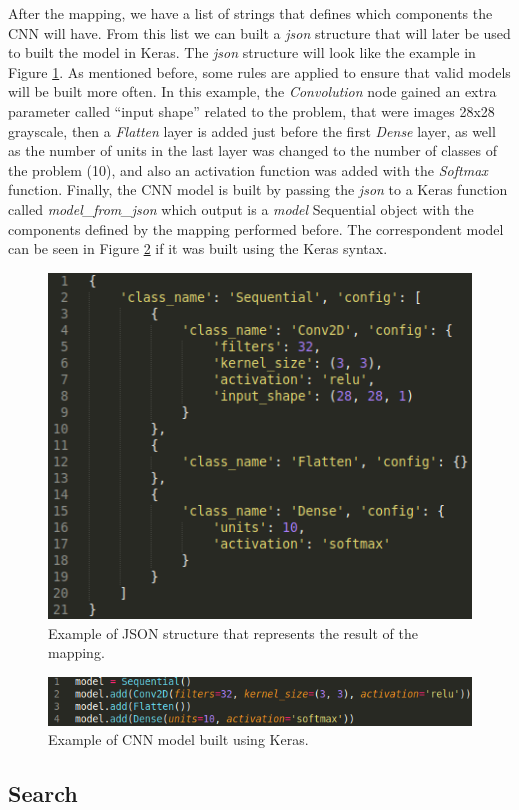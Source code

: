 \documentclass[12pt]{article}
\begin{document}
After the mapping, we have a list of strings that defines which components the CNN will have. From this list we can built a \textit{json} structure that will later be used to built the model in Keras. The \textit{json} structure will look like the example in Figure \ref{fig:json-example}. As mentioned before, some rules are applied to ensure that valid models will be built more often. In this example, the \textit{Convolution} node gained an extra parameter called ``input shape'' related to the problem, that were images 28x28 grayscale, then a \textit{Flatten} layer is added just before the first \textit{Dense} layer, as well as the number of units in the last layer was changed to the number of classes of the problem (10), and also an activation function was added with the \textit{Softmax} function. Finally, the CNN model is built by passing the \textit{json} to a Keras function called \textit{model\_from\_json} which output is a \textit{model} Sequential object with the components defined by the mapping performed before. The correspondent model can be seen in Figure \ref{fig:model-example} if it was built using the Keras syntax.


\begin{figure}[!htb]
	\includegraphics[width=\linewidth]{images/json-example.png}
	\caption{Example of JSON structure that represents the result of the mapping.}
	\label{fig:json-example}
\end{figure}


\begin{figure}[!htb]
	\includegraphics[width=\linewidth]{images/model-example.png}
	\caption{Example of CNN model built using Keras.}
	\label{fig:model-example}
\end{figure}


\subsection{Search}



\end{document}
